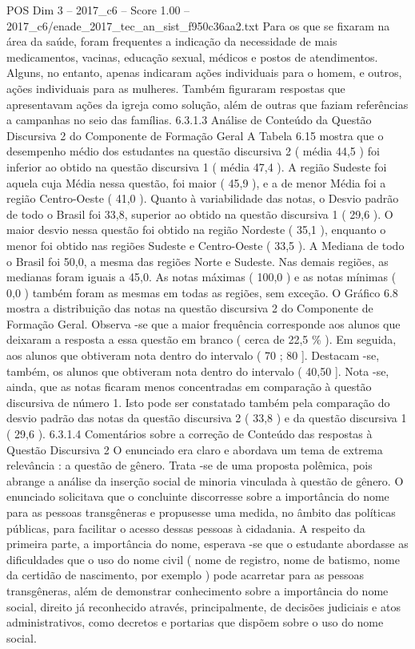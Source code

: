 \begin{textsample}{POS Dim 3 – 2017\_c6 – Score 1.00 – 2017\_c6/enade\_2017\_tec\_an\_sist\_f950c36aa2.txt}
Para os que se fixaram na área da saúde, foram frequentes a indicação da necessidade de mais medicamentos, vacinas, educação sexual, médicos e postos de atendimentos.
Alguns, no entanto, apenas indicaram ações individuais para o homem, e outros, ações individuais para as mulheres.
Também figuraram respostas que apresentavam ações da igreja como solução, além de outras que faziam referências a campanhas no seio das famílias. 6.3.1.3 Análise de Conteúdo da Questão Discursiva 2 do Componente de Formação Geral A Tabela 6.15 mostra que o desempenho médio dos estudantes na questão discursiva 2 ( média 44,5 ) foi inferior ao obtido na questão discursiva 1 ( média 47,4 ).
A região Sudeste foi aquela cuja Média nessa questão, foi maior ( 45,9 ), e a de menor Média foi a região Centro-Oeste ( 41,0 ).
Quanto à variabilidade das notas, o Desvio padrão de todo o Brasil foi 33,8, superior ao obtido na questão discursiva 1 ( 29,6 ).
O maior desvio nessa questão foi obtido na região Nordeste ( 35,1 ), enquanto o menor foi obtido nas regiões Sudeste e Centro-Oeste ( 33,5 ).
A Mediana de todo o Brasil foi 50,0, a mesma das regiões Norte e Sudeste.
Nas demais regiões, as medianas foram iguais a 45,0.
As notas máximas ( 100,0 ) e as notas mínimas ( 0,0 ) também foram as mesmas em todas as regiões, sem exceção.
O Gráfico 6.8 mostra a distribuição das notas na questão discursiva 2 do Componente de Formação Geral.
Observa -se que a maior frequência corresponde aos alunos que deixaram a resposta a essa questão em branco ( cerca de 22,5 \% ).
Em seguida, aos alunos que obtiveram nota dentro do intervalo ( 70 ; 80 ].
Destacam -se, também, os alunos que obtiveram nota dentro do intervalo ( 40,50 ].
Nota -se, ainda, que as notas ficaram menos concentradas em comparação à questão discursiva de número 1.
Isto pode ser constatado também pela comparação do desvio padrão das notas da questão discursiva 2 ( 33,8 ) e da questão discursiva 1 ( 29,6 ). 6.3.1.4 Comentários sobre a correção de Conteúdo das respostas à Questão Discursiva 2 O enunciado era claro e abordava um tema de extrema relevância : a questão de gênero.
Trata -se de uma proposta polêmica, pois abrange a análise da inserção social de minoria vinculada à questão de gênero.
O enunciado solicitava que o concluinte discorresse sobre a importância do nome para as pessoas transgêneras e propusesse uma medida, no âmbito das políticas públicas, para facilitar o acesso dessas pessoas à cidadania.
A respeito da primeira parte, a importância do nome, esperava -se que o estudante abordasse as dificuldades que o uso do nome civil ( nome de registro, nome de batismo, nome da certidão de nascimento, por exemplo ) pode acarretar para as pessoas transgêneras, além de demonstrar conhecimento sobre a importância do nome social, direito já reconhecido através, principalmente, de decisões judiciais e atos administrativos, como decretos e portarias que dispõem sobre o uso do nome social.

\end{textsample}
